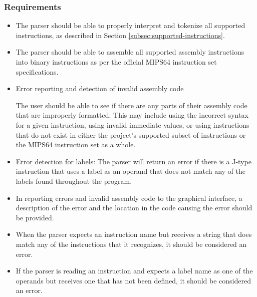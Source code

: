 \documentclass[
    paper=letter,
    parskip=half,
    fontsize=12pt,
    titlepage=firstiscover,
    toc=bibliography,
    numbers=endperiod
]{scrartcl}
\begin{document}
\subsubsection{Requirements}
\begin{itemize}
    \item The parser should be able to properly interpret and tokenize all
          supported instructions, as described in Section
          \ref{subsec:supported-instructions}.
    \item The parser should be able to assemble all supported assembly
          instructions into binary instructions as per the official MIPS64
          instruction set specifications.
    \item Error reporting and detection of invalid assembly code

          The user should be able to see if there are any parts of their assembly
          code that are improperly formatted. This may include using the incorrect
          syntax for a given instruction, using invalid immediate values, or using
          instructions that do not exist in either the project's supported subset
          of instructions or the MIPS64 instruction set as a whole.
    \item Error detection for labels: The parser will return an error if there is
          a J-type instruction that uses a label as an operand that does not match
          any of the labels found throughout the program.
    \item In reporting errors and invalid assembly code to the graphical
          interface, a description of the error and the location in the code
          causing the error should be provided.
    \item When the parser expects an instruction name but receives a string that
          does match any of the instructions that it recognizes, it should be
          considered an error.
    \item If the parser is reading an instruction and expects a label name as one
          of the operands but receives one that has not been defined, it should be
          considered an error.
\end{itemize}
\end{document}
